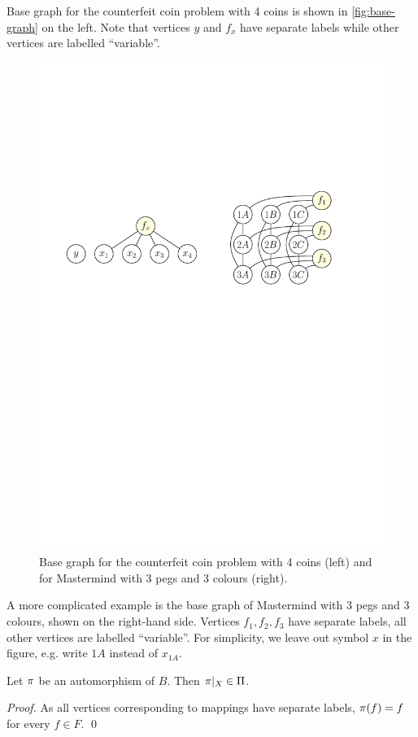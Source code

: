 \begin{example} \label{ex:cc-runbase}
Base graph for the counterfeit coin problem with 4 coins is shown in
\autoref{fig:base-graph} on the left.
Note that vertices $y$ and $f_x$ have separate labels while
  other vertices are labelled ``variable''.

\begin{figure}[ht]
\begin{center}
\includegraphics[width=.6\textwidth]{pictures/base-graph.pdf}
\caption{Base graph for the counterfeit coin problem with 4 coins (left) and\\
  for Mastermind with 3 pegs and 3 colours (right).}
\label{fig:base-graph}
\end{center}
\end{figure}
\end{example}

A more complicated example is the base graph of Mastermind with 3 pegs and 3 colours,
  shown on the right-hand side.
Vertices $f_1, f_2, f_3$ have separate labels, all other vertices are labelled ``variable''.
For simplicity, we leave out symbol $x$ in the figure, e.g.
  write $1A$ instead of $x_{1A}$.\eqed

\begin{lemma}\label{lma:autobase}
Let  $\pi$ be an automorphism of $B$. Then $\pi|_X \in\Pi$.
\end{lemma}

\begin{proof}
As all vertices corresponding to mappings have separate labels, $\pi(f) = f$ for every $f\in F$.
 \qed
\end{proof}

